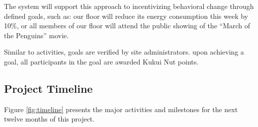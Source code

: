 \documentclass[11pt]{article}
\begin{document}
The system will support this approach to incentivizing behavioral change
through defined goals, such as: our floor will reduce its energy
consumption this week by 10\%, or all members of our floor will attend the
public showing of the ``March of the Penguins'' movie.  

Similar to activities, goals are verified by site administrators.  upon
achieving a goal, all participants in the goal are awarded Kukui Nut
points.  


\subsection{Project Timeline}

Figure \ref{fig:timeline} presents the major activities and milestones  for the next twelve months of this project.
\end{document}
